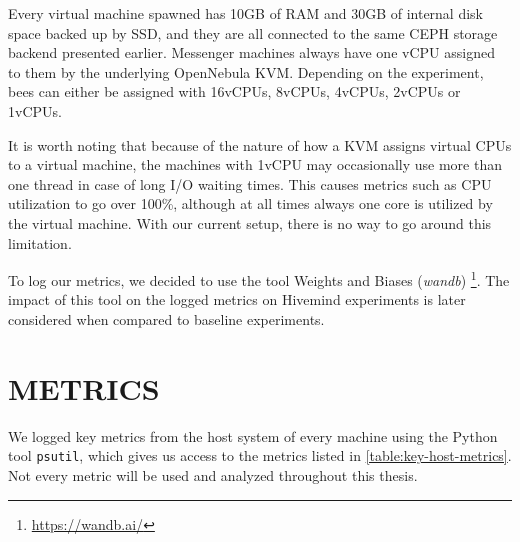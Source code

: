 Every virtual machine spawned has 10GB of RAM and 30GB of internal disk space backed up by SSD, and they are all connected to the same CEPH storage backend presented earlier.
Messenger machines always have one vCPU assigned to them by the underlying OpenNebula KVM.
Depending on the experiment, bees can either be assigned with 16vCPUs, 8vCPUs, 4vCPUs, 2vCPUs or 1vCPUs.

It is worth noting that because of the nature of how a KVM assigns virtual CPUs to a virtual machine, the machines with 1vCPU may occasionally use more than one thread in case of long I/O waiting times.
This causes metrics such as CPU utilization to go over 100\%, although at all times always one core is utilized by the virtual machine.
With our current setup, there is no way to go around this limitation.

To log our metrics, we decided to use the tool Weights and Biases (\textit{wandb}) \footnote{\href{https://wandb.ai/}{https://wandb.ai/}}.
The impact of this tool on the logged metrics on Hivemind experiments is later considered when compared to baseline experiments.

\section{METRICS}
We logged key metrics from the host system of every machine using the Python tool \texttt{psutil}, which gives us access to the metrics listed in \autoref{table:key-host-metrics}.
Not every metric will be used and analyzed throughout this thesis.

